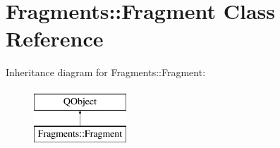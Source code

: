 \hypertarget{classFragments_1_1Fragment}{}\section{Fragments\+:\+:Fragment Class Reference}
\label{classFragments_1_1Fragment}
Inheritance diagram for Fragments\+:\+:Fragment\+:\begin{figure}[H]
\begin{center}
\leavevmode
\includegraphics[height=2.000000cm]{classFragments_1_1Fragment}
\end{center}
\end{figure}
